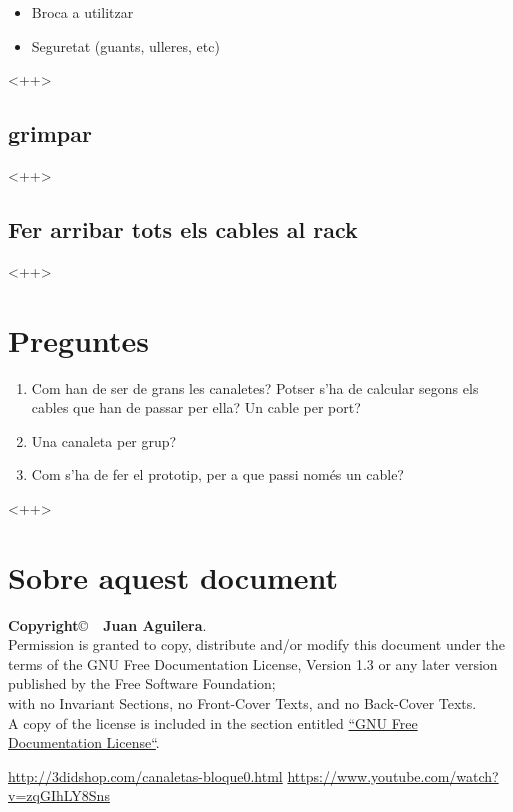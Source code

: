 \documentclass[a4paper]{article}
\begin{document}
\begin{itemize}
	\item Broca a utilitzar
	\item Seguretat (guants, ulleres, etc)
\end{itemize}<++>

\subsection{grimpar}<++>

\subsection{Fer arribar tots els cables al rack}<++>

\section{Preguntes}

\begin{enumerate}
	\item Com han de ser de grans les canaletes? Potser s'ha de calcular segons els cables que han de passar per ella? Un cable per port?
	\item Una canaleta per grup?
	\item Com s'ha de fer el prototip, per a que passi nom\'{e}s un cable?
\end{enumerate}<++>

\section{Sobre aquest document}
\textbf{Copyright}\copyright\ \textbf{\the\year\ Juan Aguilera}.\\
Permission is granted to copy, distribute and/or modify this document under the terms of the GNU Free Documentation License, Version 1.3 or any later version published by the Free Software Foundation;\\
with no Invariant Sections, no Front-Cover Texts, and no Back-Cover Texts.\\
A copy of the license is included in the section entitled \href{http://www.gnu.org/licenses/fdl.html}{``GNU Free Documentation License``}.
\begin{thebibliography}{99}
	\bibitem{<++>} 
		\url{http://3didshop.com/canaletas-bloque0.html}
		\url{https://www.youtube.com/watch?v=zqGIhLY8Sns}


\end{thebibliography}
\end{document}
